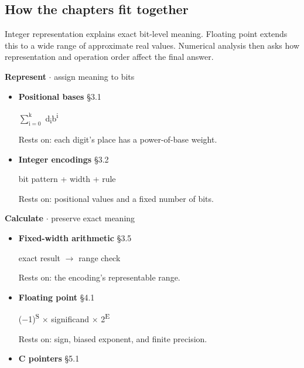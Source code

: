 \documentclass[11pt]{article}
\begin{document}
\begin{keepsection}
\section{How the chapters fit together}

Integer representation explains exact bit-level meaning. Floating point extends this to a wide range of approximate real values. Numerical analysis then asks how representation and operation order affect the final answer.

\textbf{Represent} \ensuremath{\cdot} assign meaning to bits

\begin{itemize}
\item {}
\textbf{Positional bases} \hfill{\small\color{FAUblue}§3.1}

$\sum_{\mathrm{i}=0}^{\mathrm{k}} $ d\textsubscript{i}b\textsuperscript{i}

Rests on: each digit's place has a power-of-base weight.
\item {}
\textbf{Integer encodings} \hfill{\small\color{FAUblue}§3.2}

bit pattern + width + rule

Rests on: positional values and a fixed number of bits.
\end{itemize}

\textbf{Calculate} \ensuremath{\cdot} preserve exact meaning

\begin{itemize}
\item {}
\textbf{Fixed-width arithmetic} \hfill{\small\color{FAUblue}§3.5}

exact result \ensuremath{\to} range check

Rests on: the encoding's representable range.
\item {}
\textbf{Floating point} \hfill{\small\color{FAUblue}§4.1}

(\ensuremath{-}1)\textsuperscript{S} \ensuremath{\times} significand \ensuremath{\times} 2\textsuperscript{E}

Rests on: sign, biased exponent, and finite precision.
\item {}
\textbf{C pointers} \hfill{\small\color{FAUblue}§5.1}


\end{itemize}
\end{keepsection}
\end{document}
